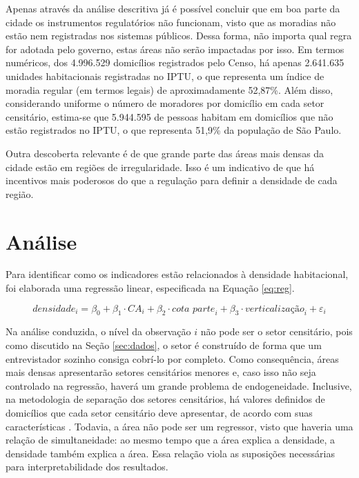 Apenas através da análise descritiva já é possível concluir que em boa parte da cidade os instrumentos regulatórios não funcionam, visto que as moradias não estão nem registradas nos sistemas públicos. Dessa forma, não importa qual regra for adotada pelo governo, estas áreas não serão impactadas por isso. Em termos numéricos, dos 4.996.529 domicílios registrados pelo Censo, há apenas 2.641.635 unidades habitacionais registradas no IPTU, o que representa um índice de moradia regular (em termos legais) de aproximadamente 52,87\%. Além disso, considerando uniforme o número de moradores por domicílio em cada setor censitário, estima-se que 5.944.595 de pessoas habitam em domicílios que não estão registrados no IPTU, o que representa 51,9\% da população de São Paulo.

Outra descoberta relevante é de que grande parte das áreas mais densas da cidade estão em regiões de irregularidade. Isso é um indicativo de que há incentivos mais poderosos do que a regulação para definir a densidade de cada região.



\chapter{Análise}
\label{sec:analise}

Para identificar como os indicadores estão relacionados à densidade habitacional, foi elaborada uma regressão linear, especificada na Equação \ref{eq:reg}. 

\begin{equation}
    \textit{densidade}_i = \beta_0 + \beta_1 \cdot \textit{CA}_i + \beta_2 \cdot\textit{cota parte}_i + \beta_3\cdot\textit{verticalização}_i + \varepsilon_i
    \label{eq:reg}
\end{equation}

Na análise conduzida, o nível da observação $i$ não pode ser o setor censitário, pois como discutido na Seção \ref{sec:dados}, o setor é construído de forma que um entrevistador sozinho consiga cobrí-lo por completo. Como consequência, áreas mais densas apresentarão setores censitários menores e, caso isso não seja controlado na regressão, haverá um grande problema de endogeneidade. Inclusive, na metodologia de separação dos setores censitários, há valores definidos de domicílios que cada setor censitário deve apresentar, de acordo com suas características \cite{IBGE2024}. Todavia, a área não pode ser um regressor, visto que haveria uma relação de simultaneidade: ao mesmo tempo que a área explica a densidade, a densidade também explica a área. Essa relação viola as suposições necessárias para interpretabilidade dos resultados.

